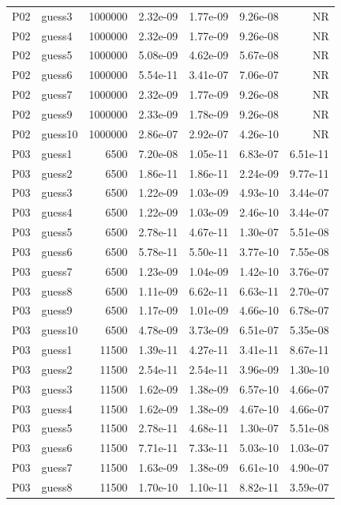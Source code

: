 {\begin{longtable}{llrrrrr}
P02 & guess3 & 1000000 & 2.32e-09 & 1.77e-09 & 9.26e-08 & NR \\
P02 & guess4 & 1000000 & 2.32e-09 & 1.77e-09 & 9.26e-08 & NR \\
P02 & guess5 & 1000000 & 5.08e-09 & 4.62e-09 & 5.67e-08 & NR \\
P02 & guess6 & 1000000 & 5.54e-11 & 3.41e-07 & 7.06e-07 & NR \\
P02 & guess7 & 1000000 & 2.32e-09 & 1.77e-09 & 9.26e-08 & NR \\
P02 & guess9 & 1000000 & 2.33e-09 & 1.78e-09 & 9.26e-08 & NR \\
P02 & guess10 & 1000000 & 2.86e-07 & 2.92e-07 & 4.26e-10 & NR \\
P03 & guess1 & 6500 & 7.20e-08 & 1.05e-11 & 6.83e-07 & 6.51e-11 \\
P03 & guess2 & 6500 & 1.86e-11 & 1.86e-11 & 2.24e-09 & 9.77e-11 \\
P03 & guess3 & 6500 & 1.22e-09 & 1.03e-09 & 4.93e-10 & 3.44e-07 \\
P03 & guess4 & 6500 & 1.22e-09 & 1.03e-09 & 2.46e-10 & 3.44e-07 \\
P03 & guess5 & 6500 & 2.78e-11 & 4.67e-11 & 1.30e-07 & 5.51e-08 \\
P03 & guess6 & 6500 & 5.78e-11 & 5.50e-11 & 3.77e-10 & 7.55e-08 \\
P03 & guess7 & 6500 & 1.23e-09 & 1.04e-09 & 1.42e-10 & 3.76e-07 \\
P03 & guess8 & 6500 & 1.11e-09 & 6.62e-11 & 6.63e-11 & 2.70e-07 \\
P03 & guess9 & 6500 & 1.17e-09 & 1.01e-09 & 4.66e-10 & 6.78e-07 \\
P03 & guess10 & 6500 & 4.78e-09 & 3.73e-09 & 6.51e-07 & 5.35e-08 \\
P03 & guess1 & 11500 & 1.39e-11 & 4.27e-11 & 3.41e-11 & 8.67e-11 \\
P03 & guess2 & 11500 & 2.54e-11 & 2.54e-11 & 3.96e-09 & 1.30e-10 \\
P03 & guess3 & 11500 & 1.62e-09 & 1.38e-09 & 6.57e-10 & 4.66e-07 \\
P03 & guess4 & 11500 & 1.62e-09 & 1.38e-09 & 4.67e-10 & 4.66e-07 \\
P03 & guess5 & 11500 & 2.78e-11 & 4.68e-11 & 1.30e-07 & 5.51e-08 \\
P03 & guess6 & 11500 & 7.71e-11 & 7.33e-11 & 5.03e-10 & 1.03e-07 \\
P03 & guess7 & 11500 & 1.63e-09 & 1.38e-09 & 6.61e-10 & 4.90e-07 \\
P03 & guess8 & 11500 & 1.70e-10 & 1.10e-11 & 8.82e-11 & 3.59e-07 \\

\end{longtable}}
